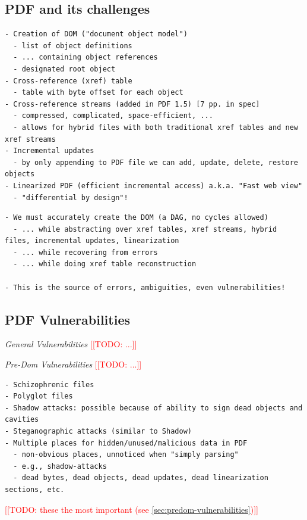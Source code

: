 \documentclass[conference,12pt]{IEEEtran}
\newcommand{\note}[1]{\noteYes{#1}}
\newcommand{\noteYes}[1]{\textcolor{red}{[[#1]]}}
\newcommand{\todo}[1]{\note{TODO: #1}}
\begin{document}
\subsection{PDF and its challenges}

\begin{lstlisting}[style=meta]
- Creation of DOM ("document object model")
  - list of object definitions
  - ... containing object references
  - designated root object
- Cross-reference (xref) table
  - table with byte offset for each object
- Cross-reference streams (added in PDF 1.5) [7 pp. in spec]
  - compressed, complicated, space-efficient, ...
  - allows for hybrid files with both traditional xref tables and new xref streams
- Incremental updates
  - by only appending to PDF file we can add, update, delete, restore objects
- Linearized PDF (efficient incremental access) a.k.a. "Fast web view"
  - "differential by design"!
\end{lstlisting}

\begin{lstlisting}[style=meta]
- We must accurately create the DOM (a DAG, no cycles allowed)
  - ... while abstracting over xref tables, xref streams, hybrid files, incremental updates, linearization
  - ... while recovering from errors
  - ... while doing xref table reconstruction

- This is the source of errors, ambiguities, even vulnerabilities!
\end{lstlisting}

\subsection{PDF Vulnerabilities}

\emph{General Vulnerabilities} \todo{...}

\emph{Pre-Dom Vulnerabilities} \todo{...}

\begin{lstlisting}[style=meta]
- Schizophrenic files
- Polyglot files
- Shadow attacks: possible because of ability to sign dead objects and cavities
- Steganographic attacks (similar to Shadow)
- Multiple places for hidden/unused/malicious data in PDF
  - non-obvious places, unnoticed when "simply parsing"
  - e.g., shadow-attacks
  - dead bytes, dead objects, dead updates, dead linearization sections, etc.
\end{lstlisting}

\todo{these the most important (see \cref{sec:predom-vulnerabilities})}
\end{document}
